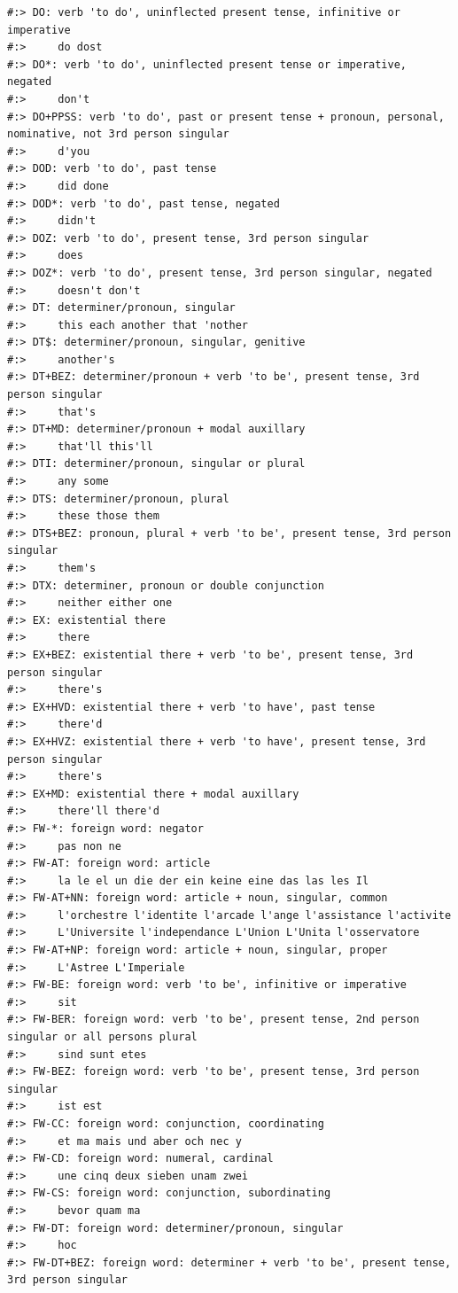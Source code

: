 \documentclass[
]{book}
\begin{document}
\begin{verbatim}
#:> DO: verb 'to do', uninflected present tense, infinitive or imperative
#:>     do dost
#:> DO*: verb 'to do', uninflected present tense or imperative, negated
#:>     don't
#:> DO+PPSS: verb 'to do', past or present tense + pronoun, personal, nominative, not 3rd person singular
#:>     d'you
#:> DOD: verb 'to do', past tense
#:>     did done
#:> DOD*: verb 'to do', past tense, negated
#:>     didn't
#:> DOZ: verb 'to do', present tense, 3rd person singular
#:>     does
#:> DOZ*: verb 'to do', present tense, 3rd person singular, negated
#:>     doesn't don't
#:> DT: determiner/pronoun, singular
#:>     this each another that 'nother
#:> DT$: determiner/pronoun, singular, genitive
#:>     another's
#:> DT+BEZ: determiner/pronoun + verb 'to be', present tense, 3rd person singular
#:>     that's
#:> DT+MD: determiner/pronoun + modal auxillary
#:>     that'll this'll
#:> DTI: determiner/pronoun, singular or plural
#:>     any some
#:> DTS: determiner/pronoun, plural
#:>     these those them
#:> DTS+BEZ: pronoun, plural + verb 'to be', present tense, 3rd person singular
#:>     them's
#:> DTX: determiner, pronoun or double conjunction
#:>     neither either one
#:> EX: existential there
#:>     there
#:> EX+BEZ: existential there + verb 'to be', present tense, 3rd person singular
#:>     there's
#:> EX+HVD: existential there + verb 'to have', past tense
#:>     there'd
#:> EX+HVZ: existential there + verb 'to have', present tense, 3rd person singular
#:>     there's
#:> EX+MD: existential there + modal auxillary
#:>     there'll there'd
#:> FW-*: foreign word: negator
#:>     pas non ne
#:> FW-AT: foreign word: article
#:>     la le el un die der ein keine eine das las les Il
#:> FW-AT+NN: foreign word: article + noun, singular, common
#:>     l'orchestre l'identite l'arcade l'ange l'assistance l'activite
#:>     L'Universite l'independance L'Union L'Unita l'osservatore
#:> FW-AT+NP: foreign word: article + noun, singular, proper
#:>     L'Astree L'Imperiale
#:> FW-BE: foreign word: verb 'to be', infinitive or imperative
#:>     sit
#:> FW-BER: foreign word: verb 'to be', present tense, 2nd person singular or all persons plural
#:>     sind sunt etes
#:> FW-BEZ: foreign word: verb 'to be', present tense, 3rd person singular
#:>     ist est
#:> FW-CC: foreign word: conjunction, coordinating
#:>     et ma mais und aber och nec y
#:> FW-CD: foreign word: numeral, cardinal
#:>     une cinq deux sieben unam zwei
#:> FW-CS: foreign word: conjunction, subordinating
#:>     bevor quam ma
#:> FW-DT: foreign word: determiner/pronoun, singular
#:>     hoc
#:> FW-DT+BEZ: foreign word: determiner + verb 'to be', present tense, 3rd person singular

\end{verbatim}
\end{document}
